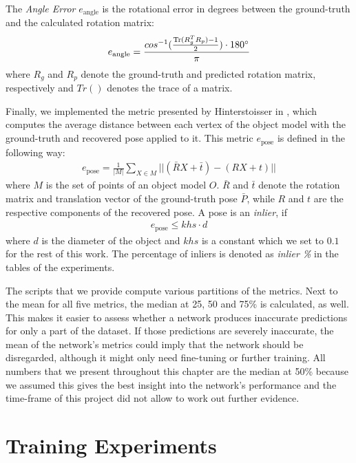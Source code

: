 The \textit{Angle Error} $e_{\text{angle}}$ is the rotational error in degrees between the ground-truth and the calculated rotation matrix:
\begin{align*}
e_{\text{angle}} = \frac{cos^{-1}(\frac{\operatorname{Tr}(R_g^TR_p) - 1}{2}) \cdot 180\degree}{\pi}
\end{align*}
where $R_g$ and $R_p$ denote the ground-truth and predicted rotation matrix, respectively and $Tr()$ denotes the trace of a matrix.

Finally, we implemented the metric presented by Hinterstoisser \etal in \cite{hinterstoisser2}, which computes the average distance between each vertex of the object model with the ground-truth and recovered pose applied to it. This metric $e_{\text{pose}}$ is defined in the following way:
\begin{align*}
e_{\text{pose}} = \frac{1}{|M|} \sum\limits_{X \in M}||(\bar{R}X + \bar{t}) - (RX + t)||
\end{align*}
where $M$ is the set of points of an object model $O$. $\bar{R}$ and $\bar{t}$ denote the rotation matrix and translation vector of the ground-truth pose $\bar{P}$, while $R$ and $t$ are the respective components of the recovered pose. A pose is an \textit{inlier}, if
\begin{align*}
e_{\text{pose}} \leq khs \cdot d
\end{align*}
where $d$ is the diameter of the object and $khs$ is a constant which we set to $0.1$ for the rest of this work. The percentage of inliers is denoted as \textit{inlier \%} in the tables of the experiments.

The scripts that we provide compute various partitions of the metrics. Next to the mean for all five metrics, the median at 25, 50 and 75\% is calculated, as well. This makes it easier to assess whether a network produces inaccurate predictions for only a part of the dataset. If those predictions are severely inaccurate, the mean of the network's metrics could imply that the network should be disregarded, although it might only need fine-tuning or further training. All numbers that we present throughout this chapter are the median at 50\% because we assumed this gives the best insight into the network's performance and the time-frame of this project did not allow to work out further evidence.

\section{Training Experiments}

